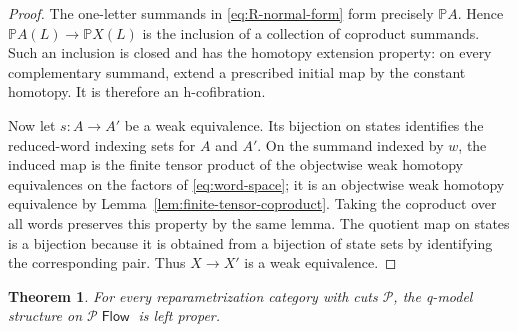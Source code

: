 \documentclass[12pt,a4paper]{amsart}
\newcommand{\Pcat}{\mathcal P}
\newcommand{\PFlow}{\Pcat\mathop{\mathsf{Flow}}}
\newcommand{\Path}{\mathbb P}
\newtheorem{thm}{Theorem}[section]
\theoremstyle{definition}
\begin{document}
\begin{proof}
The one-letter summands in \eqref{eq:R-normal-form} form precisely \(\Path A\).  Hence \(\Path A(L)\to\Path X(L)\) is the inclusion of a collection of coproduct summands.  Such an inclusion is closed and has the homotopy extension property: on every complementary summand, extend a prescribed initial map by the constant homotopy.  It is therefore an h-cofibration.

Now let \(s: A\to A'\) be a weak equivalence.  Its bijection on states identifies the reduced-word indexing sets for \(A\) and \(A'\).  On the summand indexed by \(w\), the induced map is the finite tensor product of the objectwise weak homotopy equivalences on the factors of \eqref{eq:word-space}; it is an objectwise weak homotopy equivalence by Lemma~\ref{lem:finite-tensor-coproduct}.  Taking the coproduct over all words preserves this property by the same lemma.  The quotient map on states is a bijection because it is obtained from a bijection of state sets by identifying the corresponding pair.  Thus \(X\to X'\) is a weak equivalence.
\end{proof}


\begin{thm}\label{thm:left-proper}
For every reparametrization category with cuts \(\Pcat\), the q-model structure on \(\PFlow\) is left proper.
\end{thm}
\end{document}
